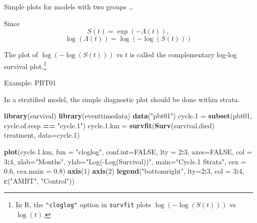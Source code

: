\documentclass[ignorenonframetext,]{beamer}
\newenvironment{Shaded}{\begin{snugshade}}{\end{snugshade}}
\newcommand{\DataTypeTok}[1]{\textcolor[rgb]{0.13,0.29,0.53}{#1}}
\newcommand{\DecValTok}[1]{\textcolor[rgb]{0.00,0.00,0.81}{#1}}
\newcommand{\FloatTok}[1]{\textcolor[rgb]{0.00,0.00,0.81}{#1}}
\newcommand{\KeywordTok}[1]{\textcolor[rgb]{0.13,0.29,0.53}{\textbf{#1}}}
\newcommand{\NormalTok}[1]{#1}
\newcommand{\OperatorTok}[1]{\textcolor[rgb]{0.81,0.36,0.00}{\textbf{#1}}}
\newcommand{\OtherTok}[1]{\textcolor[rgb]{0.56,0.35,0.01}{#1}}
\newcommand{\StringTok}[1]{\textcolor[rgb]{0.31,0.60,0.02}{#1}}
\begin{document}
\begin{frame}{%
\protect\hypertarget{simple-plots-for-models-with-two-groups-1}{%
Simple plots for models with two groups \ldots}}

Since \[
  S(t) = \exp(-\Lambda(t)),
\] \[
\log(\Lambda(t)) = \log(-\log(S(t)))
\]

The plot of \(\log(-\log(S(t)))\) vs \(t\) is called the complementary
log-log survival
plot.\footnote{In \textsf{R}, the \texttt{"cloglog"} option in \texttt{survfit} plots $\log(-\log(S(t)))$ vs $\log(t)$.}

\end{frame}

\begin{frame}[fragile]{%
\protect\hypertarget{example-pbt01}{%
Example: PBT01}}

In a stratified model, the simple diagnostic plot should be done within
strata.

\scriptsize

\begin{Shaded}
\begin{Highlighting}[]
\KeywordTok{library}\NormalTok{(survival)}
\KeywordTok{library}\NormalTok{(eventtimedata)}
\KeywordTok{data}\NormalTok{(}\StringTok{"pbt01"}\NormalTok{)}
\NormalTok{cycle}\FloatTok{.1}\NormalTok{ =}\StringTok{ }\KeywordTok{subset}\NormalTok{(pbt01, cycle.of.resp }\OperatorTok{==}\StringTok{ "cycle.1"}\NormalTok{)}
\NormalTok{cycle.}\FloatTok{1.}\NormalTok{km =}\StringTok{ }\KeywordTok{survfit}\NormalTok{(}\KeywordTok{Surv}\NormalTok{(survival,died) }\OperatorTok{~}\StringTok{ }\NormalTok{treatment, }\DataTypeTok{data=}\NormalTok{cycle}\FloatTok{.1}\NormalTok{)}

\KeywordTok{plot}\NormalTok{(cycle.}\FloatTok{1.}\NormalTok{km, }\DataTypeTok{fun =} \StringTok{"cloglog"}\NormalTok{, }\DataTypeTok{conf.int=}\OtherTok{FALSE}\NormalTok{, }\DataTypeTok{lty =} \DecValTok{2}\OperatorTok{:}\DecValTok{3}\NormalTok{, }
     \DataTypeTok{axes=}\OtherTok{FALSE}\NormalTok{, }\DataTypeTok{col =} \DecValTok{3}\OperatorTok{:}\DecValTok{4}\NormalTok{, }\DataTypeTok{xlab=}\StringTok{"Months"}\NormalTok{, }\DataTypeTok{ylab=}\StringTok{"Log(-Log(Survival))"}\NormalTok{,}
     \DataTypeTok{main=}\StringTok{"Cycle.1 Strata"}\NormalTok{,}
     \DataTypeTok{cex =} \FloatTok{0.6}\NormalTok{, }
     \DataTypeTok{cex.main =} \FloatTok{0.8}\NormalTok{)}
\KeywordTok{axis}\NormalTok{(}\DecValTok{1}\NormalTok{)}
\KeywordTok{axis}\NormalTok{(}\DecValTok{2}\NormalTok{)}
\KeywordTok{legend}\NormalTok{(}\StringTok{"bottomright"}\NormalTok{, }\DataTypeTok{lty=}\DecValTok{2}\OperatorTok{:}\DecValTok{3}\NormalTok{, }\DataTypeTok{col =} \DecValTok{3}\OperatorTok{:}\DecValTok{4}\NormalTok{, }\KeywordTok{c}\NormalTok{(}\StringTok{"AMBT"}\NormalTok{, }\StringTok{"Control"}\NormalTok{))}
\end{Highlighting}
\end{Shaded}

\end{frame}
\end{document}
